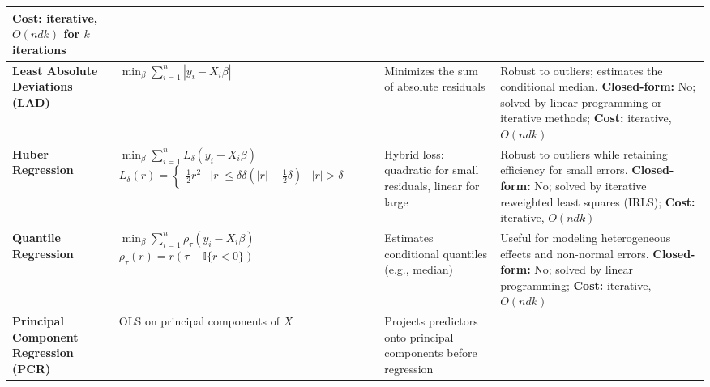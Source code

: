 \documentclass[10pt]{article}
\begin{document}
\begin{longtable}{|>{\bfseries}m{3cm}|m{5cm}|p{3.5cm}|p{6.5cm}|}
{				\textbf{Cost:} iterative, $O(ndk)$ for $k$ iterations
		} \\
		\hline
		Least Absolute Deviations (LAD) & \parbox{5cm}{
				$\min_{\beta} \sum_{i=1}^n |y_i - X_i\beta|$
		} & \parbox{3.5cm}{\vspace{2pt}Minimizes the sum of absolute residuals} &
		\parbox{6.5cm}{\vspace{2pt}
				Robust to outliers; estimates the conditional median. \\
				\textbf{Closed-form:} No; solved by linear programming or iterative methods; \\
				\textbf{Cost:} iterative, $O(ndk)$
		} \\
		\hline
		Huber Regression & \parbox{5cm}{
				$\min_{\beta} \sum_{i=1}^n L_\delta(y_i - X_i\beta)$ \\
				$L_\delta(r) =
				\begin{cases} \frac{1}{2}r^2 & |r| \leq \delta \\ \delta(|r| - \frac{1}{2}\delta) & |r| > \delta
				\end{cases}$
		} & \parbox{3.5cm}{\vspace{2pt}Hybrid loss: quadratic for small residuals, linear for
		large} & \parbox{6.5cm}{\vspace{2pt}
				Robust to outliers while retaining efficiency for small errors. \\
				\textbf{Closed-form:} No; solved by iterative reweighted least squares (IRLS); \\
				\textbf{Cost:} iterative, $O(ndk)$
		} \\
		\hline
		Quantile Regression & \parbox{5cm}{
				$\min_{\beta} \sum_{i=1}^n \rho_\tau(y_i - X_i\beta)$ \\
				$\rho_\tau(r) = r(\tau - \mathbb{I}\{r < 0\})$
		} & \parbox{3.5cm}{\vspace{2pt}Estimates conditional quantiles (e.g., median)} &
		\parbox{6.5cm}{\vspace{2pt}
				Useful for modeling heterogeneous effects and non-normal errors. \\
				\textbf{Closed-form:} No; solved by linear programming; \\
				\textbf{Cost:} iterative, $O(ndk)$
		} \\
		\hline
		Principal Component Regression (PCR) & \parbox{5cm}{
				OLS on principal components of $X$
		} & \parbox{3.5cm}{\vspace{2pt}Projects predictors onto principal components before
		regression} & \parbox{6.5cm}{\vspace{2pt}
}
\end{longtable}
\end{document}
